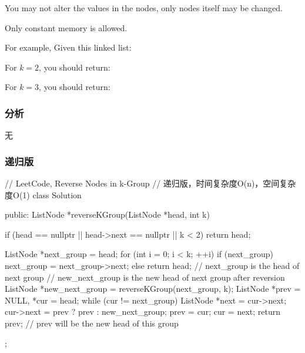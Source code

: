 You may not alter the values in the nodes, only nodes itself may be changed.

Only constant memory is allowed.

For example,
Given this linked list: 

For $k = 2$, you should return: 

For $k = 3$, you should return: 


\subsubsection{分析}
无


\subsubsection{递归版}
\begin{Code}
// LeetCode, Reverse Nodes in k-Group
// 递归版，时间复杂度O(n)，空间复杂度O(1)
class Solution {
public:
    ListNode *reverseKGroup(ListNode *head, int k) {
        if (head == nullptr || head->next == nullptr || k < 2)
            return head;

        ListNode *next_group = head;
        for (int i = 0; i < k; ++i) {
            if (next_group)
                next_group = next_group->next;
            else
                return head;
        }
        // next_group is the head of next group
        // new_next_group is the new head of next group after reversion
        ListNode *new_next_group = reverseKGroup(next_group, k);
        ListNode *prev = NULL, *cur = head;
        while (cur != next_group) {
            ListNode *next = cur->next;
            cur->next = prev ? prev : new_next_group;
            prev = cur;
            cur = next;
        }
        return prev; // prev will be the new head of this group
    }
};
\end{Code}



